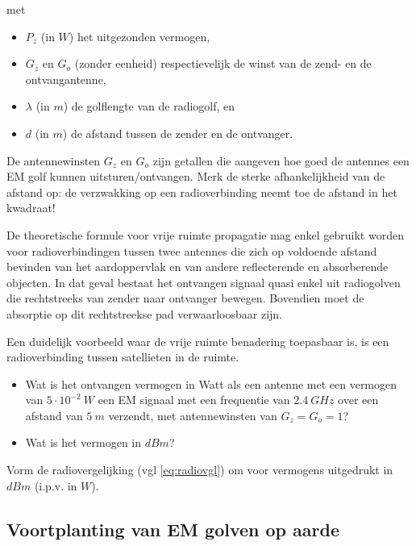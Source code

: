 met
\begin{itemize}
    \item $P_z$ (in $W$) het uitgezonden vermogen, 
    \item $G_z$ en $G_o$ (zonder eenheid) respectievelijk de winst van de zend- en de ontvangantenne, 
    \item $\lambda$ (in $m$) de golflengte van de radiogolf, en 
    \item $d$ (in $m$) de afstand tussen de zender en de ontvanger.  
\end{itemize}
De antennewinsten $G_z$ en $G_o$ zijn getallen die aangeven hoe goed de antennes een EM golf kunnen uitsturen/ontvangen. Merk de sterke afhankelijkheid van de afstand op: de verzwakking op een radioverbinding neemt toe de afstand in het kwadraat!

De theoretische formule voor vrije ruimte propagatie mag enkel gebruikt worden voor radioverbindingen tussen twee antennes die zich op voldoende afstand bevinden van het aardoppervlak en van andere reflecterende en absorberende objecten. In dat geval bestaat het ontvangen signaal quasi enkel uit radiogolven die rechtstreeks van zender naar ontvanger bewegen. Bovendien moet de absorptie op dit rechtstreekse pad verwaarloosbaar zijn.

Een duidelijk voorbeeld waar de vrije ruimte benadering toepasbaar is, is een radioverbinding tussen satellieten in de ruimte.

\begin{oef}
\begin{itemize}
    \item Wat is het ontvangen vermogen in Watt als een antenne met een vermogen van $5 \cdot 10^{-2} ~W$ een EM signaal met een frequentie van $2.4~GHz$ over een afstand van $5~m$ verzendt, met antennewinsten van $G_z=G_o=1$?
    \item Wat is het vermogen in $dBm$?
\end{itemize}
\end{oef}

\begin{oef}
Vorm de radiovergelijking (vgl \ref{eq:radiovgl}) om voor vermogens uitgedrukt in $dBm$ (i.p.v. in $W$).
\end{oef}

\subsection{Voortplanting van EM golven op aarde}

